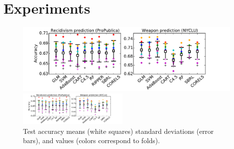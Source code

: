 \section{Experiments}
\label{sec:experiments}

\begin{figure}[t!]
\begin{center}
\begin{arxiv}
\includegraphics[trim={10mm, 5mm, 25mm, 5mm},
width=\textwidth]{figs/compare-compas-weapon.pdf}
\end{arxiv}
\begin{kdd}
\includegraphics[trim={10mm, 11mm, 25mm, 5mm},
width=0.48\textwidth]{figs/compare-compas-weapon.pdf}
\end{kdd}
\end{center}
\caption{Test accuracy means (white squares)
standard deviations (error bars),
and values (colors correspond to folds).
}
\label{fig:comparison}
\end{figure}

